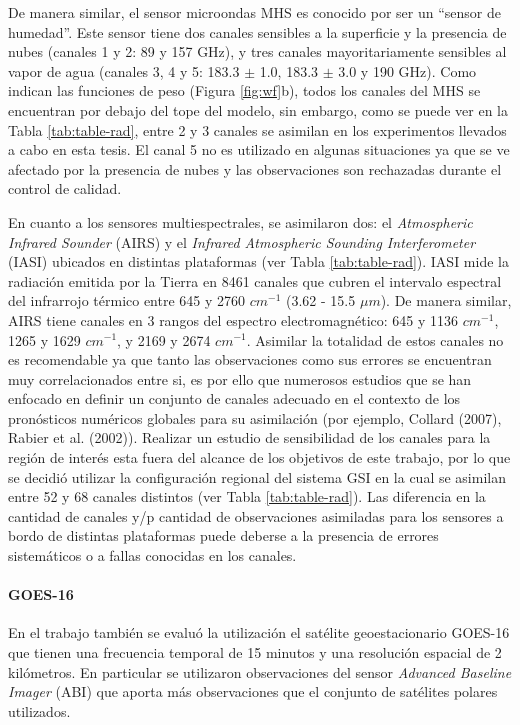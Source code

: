 \documentclass[12pt,oneside,a4paper]{reedthesis}
\begin{document}
De manera similar, el sensor microondas MHS es conocido por ser un ``sensor de humedad''. Este sensor tiene dos canales sensibles a la superficie y la presencia de nubes (canales 1 y 2: 89 y 157 GHz), y tres canales mayoritariamente sensibles al vapor de agua (canales 3, 4 y 5: 183.3 \(\pm\) 1.0, 183.3 \(\pm\) 3.0 y 190 GHz). Como indican las funciones de peso (Figura \ref{fig:wf}b), todos los canales del MHS se encuentran por debajo del tope del modelo, sin embargo, como se puede ver en la Tabla \ref{tab:table-rad}, entre 2 y 3 canales se asimilan en los experimentos llevados a cabo en esta tesis. El canal 5 no es utilizado en algunas situaciones ya que se ve afectado por la presencia de nubes y las observaciones son rechazadas durante el control de calidad.

En cuanto a los sensores multiespectrales, se asimilaron dos: el \emph{Atmospheric Infrared Sounder} (AIRS) y el \emph{Infrared Atmospheric Sounding Interferometer} (IASI) ubicados en distintas plataformas (ver Tabla \ref{tab:table-rad}). IASI mide la radiación emitida por la Tierra en 8461 canales que cubren el intervalo espectral del infrarrojo térmico entre 645 y 2760 \(cm^{-1}\) (3.62 - 15.5 \(\mu m\)). De manera similar, AIRS tiene canales en 3 rangos del espectro electromagnético: 645 y 1136 \(cm^{-1}\), 1265 y 1629 \(cm^{-1}\), y 2169 y 2674 \(cm^{-1}\). Asimilar la totalidad de estos canales no es recomendable ya que tanto las observaciones como sus errores se encuentran muy correlacionados entre si, es por ello que numerosos estudios que se han enfocado en definir un conjunto de canales adecuado en el contexto de los pronósticos numéricos globales para su asimilación (por ejemplo, Collard (2007), Rabier et al. (2002)). Realizar un estudio de sensibilidad de los canales para la región de interés esta fuera del alcance de los objetivos de este trabajo, por lo que se decidió utilizar la configuración regional del sistema GSI en la cual se asimilan entre 52 y 68 canales distintos (ver Tabla \ref{tab:table-rad}). Las diferencia en la cantidad de canales y/p cantidad de observaciones asimiladas para los sensores a bordo de distintas plataformas puede deberse a la presencia de errores sistemáticos o a fallas conocidas en los canales.

\hypertarget{goes-16}{%
\paragraph{GOES-16}\label{goes-16}}

En el trabajo también se evaluó la utilización el satélite geoestacionario GOES-16 que tienen una frecuencia temporal de 15 minutos y una resolución espacial de 2 kilómetros. En particular se utilizaron observaciones del sensor \emph{Advanced Baseline Imager} (ABI) que aporta más observaciones que el conjunto de satélites polares utilizados.
\end{document}
